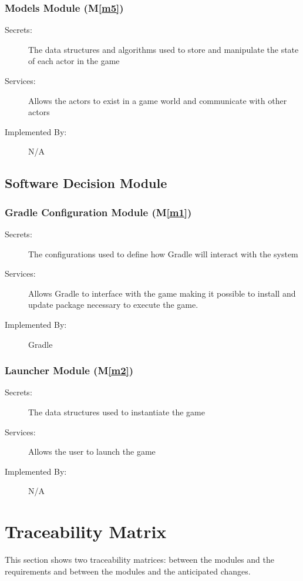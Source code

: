 \documentclass[12pt, titlepage]{article}
\newcommand{\mref}[1]{M\ref{#1}}
\begin{document}
\subsubsection{Models Module (\mref{m5})}
\begin{description}
\item[Secrets:] The data structures and algorithms used to store and manipulate the state of each actor in the game
\item[Services:] Allows the actors to exist in a game world and communicate with other actors
\item[Implemented By:] N/A
\end{description}

\subsection{Software Decision Module}

\subsubsection{Gradle Configuration Module (\mref{m1})}
\begin{description}
\item[Secrets:] The configurations used to define how Gradle will interact with the system
\item[Services:] Allows Gradle to interface with the game making it possible to install and update package necessary to execute the game.
\item[Implemented By:] Gradle
\end{description}

\subsubsection{Launcher Module (\mref{m2})}
\begin{description}
\item[Secrets:] The data structures used to instantiate the game
\item[Services:] Allows the user to launch the game
\item[Implemented By:] N/A
\end{description}


\section{Traceability Matrix} \label{SecTM}

This section shows two traceability matrices: between the modules and the
requirements and between the modules and the anticipated changes.
\end{document}
